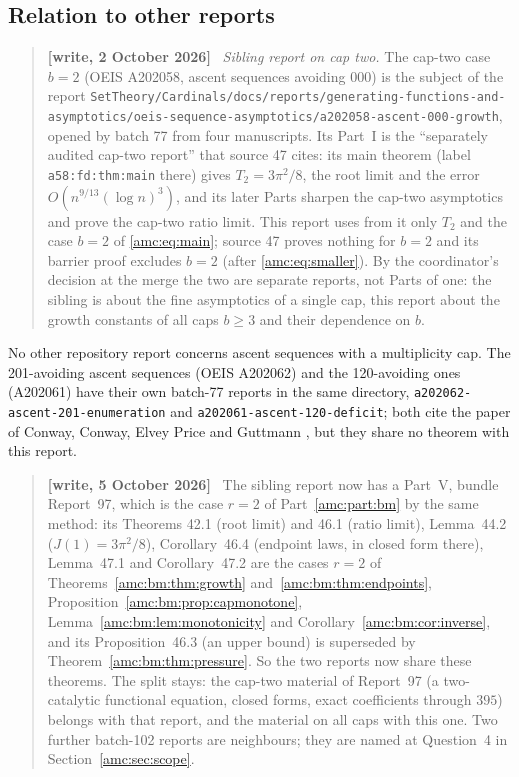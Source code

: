 \documentclass[11pt,letterpaper]{article}
\theoremstyle{remark}\newtheorem{remark}[theorem]{Remark}
\newenvironment{writenote}{\par\smallskip\begin{quote}\small\textbf{[write, 2 October 2026]}\ }{\end{quote}\smallskip}
\newenvironment{writenotedated}[1]{\par\smallskip\begin{quote}\small\textbf{[write, #1]}\ }{\end{quote}\smallskip}
\newcommand{\repopath}[1]{\nolinkurl{#1}}
\begin{document}
\subsection*{Relation to other reports}
\label{amc:guide:relations}
\begin{writenote}
\emph{Sibling report on cap two.} The cap-two case $b=2$ (OEIS A202058, ascent sequences avoiding 000) is the subject of the report \repopath{SetTheory/Cardinals/docs/reports/generating-functions-and-asymptotics/oeis-sequence-asymptotics/a202058-ascent-000-growth}, opened by batch 77 from four manuscripts. Its Part~I is the ``separately audited cap-two report'' that source 47 cites: its main theorem (label \texttt{a58:fd:thm:main} there) gives $T_2=3\pi^2/8$, the root limit and the error $O(n^{9/13}(\log n)^3)$, and its later Parts sharpen the cap-two asymptotics and prove the cap-two ratio limit. This report uses from it only $T_2$ and the case $b=2$ of \eqref{amc:eq:main}; source 47 proves nothing for $b=2$ and its barrier proof excludes $b=2$ (after \eqref{amc:eq:smaller}). By the coordinator's decision at the merge the two are separate reports, not Parts of one: the sibling is about the fine asymptotics of a single cap, this report about the growth constants of all caps $b\ge3$ and their dependence on $b$.
\end{writenote}
No other repository report concerns ascent sequences with a multiplicity cap. The 201-avoiding ascent sequences (OEIS A202062) and the 120-avoiding ones (A202061) have their own batch-77 reports in the same directory, \repopath{a202062-ascent-201-enumeration} and \repopath{a202061-ascent-120-deficit}; both cite the paper of Conway, Conway, Elvey Price and Guttmann \cite{CCEG}, but they share no theorem with this report.
\begin{writenotedated}{5 October 2026}
The sibling report now has a Part~V, bundle Report~97, which is the case $r=2$ of Part~\ref{amc:part:bm} by the same method: its Theorems 42.1 (root limit) and 46.1 (ratio limit), Lemma~44.2 ($J(1)=3\pi^2/8$), Corollary~46.4 (endpoint laws, in closed form there), Lemma~47.1 and Corollary~47.2 are the cases $r=2$ of Theorems~\ref{amc:bm:thm:growth} and~\ref{amc:bm:thm:endpoints}, Proposition~\ref{amc:bm:prop:capmonotone}, Lemma~\ref{amc:bm:lem:monotonicity} and Corollary~\ref{amc:bm:cor:inverse}, and its Proposition~46.3 (an upper bound) is superseded by Theorem~\ref{amc:bm:thm:pressure}. So the two reports now share these theorems. The split stays: the cap-two material of Report~97 (a two-catalytic functional equation, closed forms, exact coefficients through $395$) belongs with that report, and the material on all caps with this one. Two further batch-102 reports are neighbours; they are named at Question~4 in Section~\ref{amc:sec:scope}.
\end{writenotedated}
\end{document}
